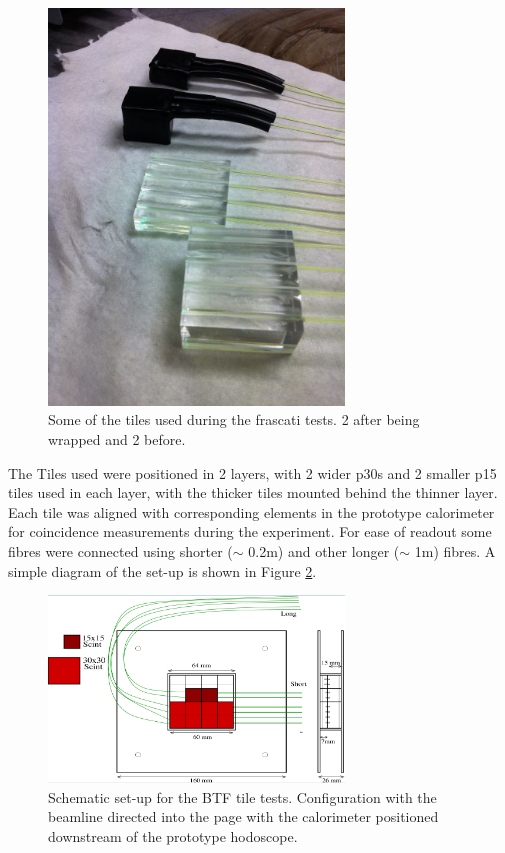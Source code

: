 \begin{figure}
	\centering
	\includegraphics[width=0.7\textwidth]{ImgChap1/frascatitile}
	\caption{Some of the tiles used during the frascati tests. 2 after being wrapped and 2 before.}
	\label{Frascati2Tiles}
\end{figure}

The Tiles used were positioned in 2 layers, with 2 wider p30s and 2 smaller p15 tiles used in each layer,  with the thicker tiles mounted behind the thinner layer. Each tile was aligned with corresponding elements in the prototype calorimeter for coincidence measurements during the experiment. For ease of readout some fibres were connected using shorter ($\sim$ 0.2m) and other longer ($\sim$ 1m) fibres. A simple diagram of the set-up is shown in Figure \ref{Frascati2SetupDiagram}. 

\begin{figure}
	\centering
	\includegraphics[width=0.7\textwidth]{ImgChap1/frascati1}
	\caption{Schematic set-up for the BTF tile tests. Configuration with the beamline directed into the page with the calorimeter positioned downstream of the prototype hodoscope.}
	\label{Frascati2SetupDiagram}
\end{figure}

